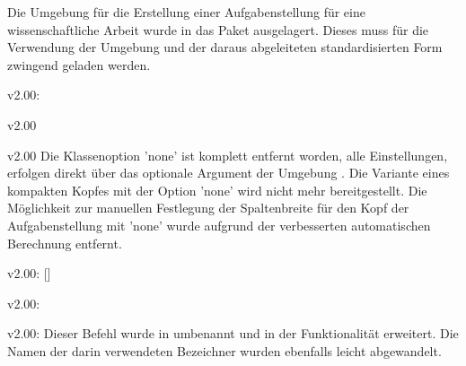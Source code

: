 \minisec{\taskname}
%
\begin{Entity}{}
Die Umgebung für die Erstellung einer Aufgabenstellung für eine 
wissenschaftliche Arbeit wurde in das Paket  
ausgelagert. Dieses muss für die Verwendung der Umgebung  
und der daraus abgeleiteten standardisierten Form zwingend geladen werden.

\begin{Obsolete}{v2.00:}
  {}
\begin{Obsolete}{v2.00}
  {}
\begin{Obsolete}{v2.00}
  {}
\printobsoletelist%
%
Die Klassenoption 'none' ist komplett entfernt worden, alle 
Einstellungen, erfolgen direkt über das optionale Argument der Umgebung 
. Die Variante eines kompakten Kopfes mit der Option 
'none' wird nicht mehr bereitgestellt. Die Möglichkeit zur 
manuellen Festlegung der Spaltenbreite für den Kopf der Aufgabenstellung mit 
'none' wurde aufgrund der verbesserten automatischen 
Berechnung entfernt.
\end{Obsolete}
\end{Obsolete}
\end{Obsolete}

\begin{Obsolete}{v2.00:}{%
  []%
}
\begin{Obsolete}{v2.00:}
  {}
\begin{Obsolete}{v2.00:}
  {}
\printobsoletelist%
%
Dieser Befehl wurde in  umbenannt und in der Funktionalität 
erweitert. Die Namen der darin verwendeten Bezeichner wurden ebenfalls leicht 
abgewandelt.
\end{Obsolete}
\end{Obsolete}
\end{Obsolete}


\end{Entity}
